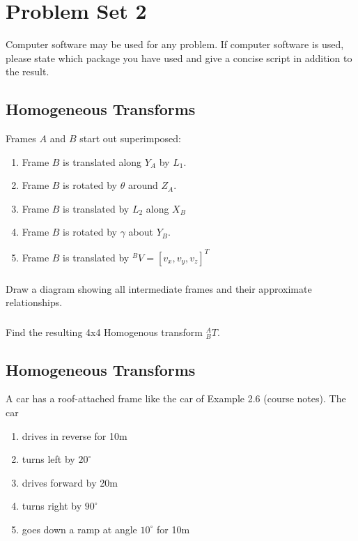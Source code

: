 \documentclass{article}
\begin{document}
\setcounter{section}{1}
\section{Problem Set 2}


Computer software may be used for any problem.   If computer software is used, please state which package you have used and give a concise script in addition to the result.


\subsection{Homogeneous Transforms}
Frames $A$ and $B$ start out superimposed:
\begin{enumerate}
    \item Frame $B$ is translated along $Y_A$ by $L_1$.
    \item Frame $B$ is rotated by $\theta$ around $Z_A$.
    \item Frame $B$ is translated by $L_2$ along $X_B$
    \item Frame $B$ is rotated by $\gamma$ about $Y_B$.
    \item Frame $B$ is translated by $^BV = [v_x,v_y,v_z]^T$
\end{enumerate}

\subsubsection{}
Draw a diagram showing all intermediate frames and their approximate relationships.

\subsubsection{}
Find the resulting 4x4 Homogenous transform $^A_BT$.


\subsection{Homogeneous Transforms}

A car has a roof-attached frame like the car of Example 2.6 (course notes).   The car
\begin{enumerate}
    \item drives in reverse for 10m
    \item turns left by $20^\circ$
    \item drives forward by 20m
    \item turns right by $90^\circ$
    \item goes down a ramp at angle $10^\circ$ for 10m
\end{enumerate}
\end{document}
